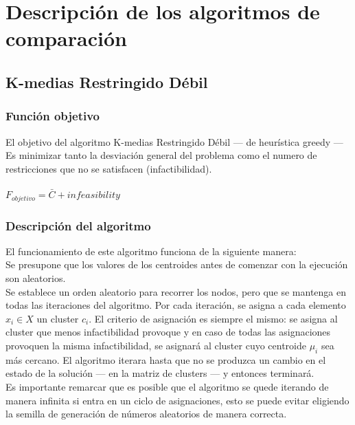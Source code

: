 \chapter{Descripción de los algoritmos de comparación}
\section{K-medias Restringido Débil}
\subsection{Función objetivo}
El objetivo del algoritmo K-medias Restringido Débil --- de heurística greedy --- Es minimizar tanto la desviación general del problema como el numero de restricciones que no se satisfacen (infactibilidad). \\
\\
$ F_{objetivo} = \bar{C} + infeasibility $

\subsection{Descripción del algoritmo}
El funcionamiento de este algoritmo funciona de la siguiente manera:\\
Se presupone que los valores de los centroides antes de comenzar con la ejecución son aleatorios.\\
Se establece un orden aleatorio para recorrer los nodos, pero que se mantenga en todas las iteraciones del algoritmo. Por cada iteración, se asigna a cada elemento $ x_{i} \in X $ un cluster $ c_{i} $. El criterio de asignación es siempre el mismo: se asigna al cluster que menos infactibilidad provoque y en caso de todas las asignaciones provoquen la misma infactibilidad, se asignará al cluster cuyo centroide  $ \mu_{i} $ sea más cercano.
El algoritmo iterara hasta que no se produzca un cambio en el estado de la solución --- en la matriz de clusters --- y entonces terminará.\\
Es importante remarcar que es posible que el algoritmo se quede iterando de manera infinita si entra en un ciclo de asignaciones, esto se puede evitar eligiendo la semilla de generación de números aleatorios de manera correcta.

